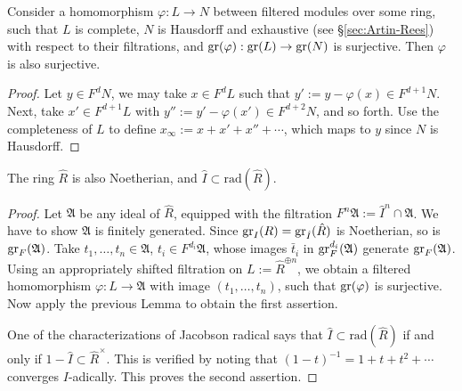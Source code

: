 \begin{lemma}\label{prop:gr-surjective}
	Consider a homomorphism $\varphi: L \to N$ between filtered modules over some ring, such that $L$ is complete, $N$ is Hausdorff and exhaustive (see \S\ref{sec:Artin-Rees}) with respect to their filtrations, and $\operatorname{gr}(\varphi): \operatorname{gr}(L) \to \operatorname{gr}(N)$ is surjective. Then $\varphi$ is also surjective.
\end{lemma}
\begin{proof}
	Let $y \in F^d N$, we may take $x \in F^d L$ such that $y' := y- \varphi(x) \in F^{d+1} N$. Next, take $x' \in F^{d+1} L$ with $y'' := y' -  \varphi(x') \in F^{d+2} N$, and so forth. Use the completeness of $L$ to define $x_\infty := x + x' + x'' + \cdots$, which maps to $y$ since $N$ is Hausdorff.
\end{proof}

\begin{proposition}\label{prop:completion-rad}
	The ring $\hat{R}$ is also Noetherian, and $\hat{I} \subset \text{rad}(\hat{R})$.
\end{proposition}
\begin{proof}
	Let $\mathfrak{A}$ be any ideal of $\hat{R}$, equipped with the filtration $F^n \mathfrak{A} := \hat{I}^n \cap \mathfrak{A}$. We have to show $\mathfrak{A}$ is finitely generated. Since $\operatorname{gr}_I(R) = \operatorname{gr}_{\hat{I}}(\hat{R})$ is Noetherian, so is $\operatorname{gr}_F(\mathfrak{A})$. Take $t_1, \ldots, t_n \in \mathfrak{A}$, $t_i \in F^{d_i} \mathfrak{A}$, whose images $\bar{t}_i$ in $\operatorname{gr}^{d_i}_F(\mathfrak{A})$ generate $\operatorname{gr}_F(\mathfrak{A})$. Using an appropriately shifted filtration on $L := \hat{R}^{\oplus n}$, we obtain a filtered homomorphism $\varphi: L \to  \mathfrak{A}$ with image $(t_1, \ldots, t_n)$, such that $\operatorname{gr}(\varphi)$ is surjective. Now apply the previous Lemma to obtain the first assertion.
	
	One of the characterizations of Jacobson radical says that $\hat{I} \subset \text{rad}(\hat{R})$ if and only if $1 - \hat{I} \subset \hat{R}^\times$. This is verified by noting that $(1-t)^{-1} = 1+t+t^2+ \cdots$ converges $I$-adically. This proves the second assertion.
\end{proof}

